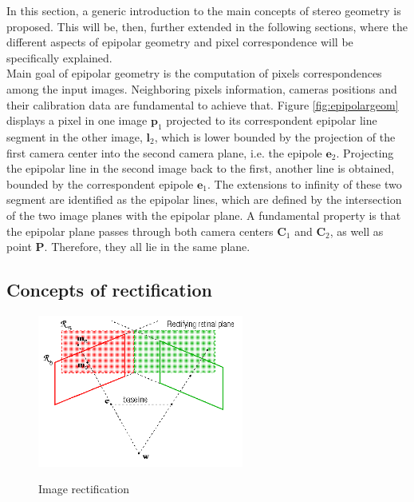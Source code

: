 In this section, a generic introduction to the main concepts of stereo geometry is proposed. 
This will be, then, further extended in the following sections, where the different aspects of epipolar geometry and pixel correspondence will be specifically explained.\\
Main goal of epipolar geometry is the computation of pixels correspondences among the input images. 
Neighboring pixels information, cameras positions and their calibration data are fundamental to achieve that.
Figure \ref{fig:epipolargeom} displays a pixel in one image $\mathbf{p}_1$ projected to its correspondent epipolar line segment in the other image, $\mathbf{l}_2$, which is lower bounded by the projection of the first camera center into the second camera plane, i.e. the epipole $\mathbf{e}_2$. 
Projecting the epipolar line in the second image back to the first, another line is obtained, bounded by the correspondent epipole $\mathbf{e}_1$. 
The extensions to infinity of these two segment are identified as the epipolar lines, which are defined by the intersection of the two image planes with the epipolar plane.
A fundamental property is that the epipolar plane passes through both camera centers $\mathbf{C}_1$ and $\mathbf{C}_2$, as well as point $\mathbf{P}$. 
Therefore, they all lie in the same plane.

\subsection{Concepts of rectification}
\label{subsection:rectification-basics}

\begin{figure}[t]
	\begin{center}
		{\includegraphics[width=.8\textwidth, height=5cm, keepaspectratio]{images/rectification}}
\caption{Image rectification}
\label{fig:rectification}
	\end{center}
\end{figure}

